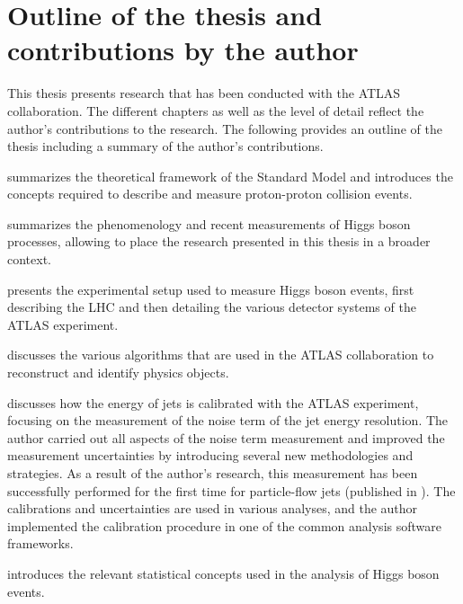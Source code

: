 \section*{Outline of the thesis and contributions by the author}
This thesis presents research that has been conducted with the ATLAS collaboration. 
The different chapters as well as the level of detail reflect the author's contributions to the research.
The following provides an outline of the thesis including a summary of the author's contributions.

 summarizes the theoretical framework of the Standard Model and introduces the concepts required to describe and measure proton-proton collision events. 

 summarizes the phenomenology and recent measurements of Higgs boson processes, allowing to place the research presented in this thesis in a broader context. 

 presents the experimental setup used to measure Higgs boson events, first describing the LHC and then detailing the various detector systems of the ATLAS experiment.

 discusses the various algorithms that are used in the ATLAS collaboration to reconstruct and identify physics objects. 

 discusses how the energy of jets is calibrated with the ATLAS experiment, focusing on the measurement of the noise term of the jet energy resolution. 
The author carried out all aspects of the noise term measurement and improved the measurement uncertainties by introducing several new methodologies and strategies. As a result of the author's research, this measurement has been successfully performed for the first time for particle-flow jets (published in ). The calibrations and uncertainties are used in various analyses, and the author implemented the calibration procedure in one of the common analysis software frameworks.

 introduces the relevant statistical concepts used in the analysis of Higgs boson events.

